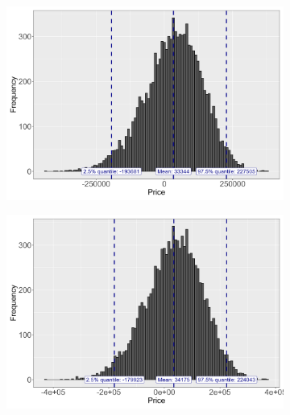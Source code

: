 \begin{figure}[!htbp]
    \centering
    \captionsetup{type=figure}
    \begin{subfigure}{0.49\textwidth}
        \centering
        \captionsetup{justification=centering}
        \includegraphics[width=\textwidth]{Figures/Prices/procedure_1_poly_model_histogram.png}
        \label{fig:irs hist of procedure 1, poly.}
    \end{subfigure}
    \hfill
    \begin{subfigure}{0.49\textwidth}
        \centering
        \captionsetup{justification=centering}
        \includegraphics[width=\textwidth]{Figures/Prices/procedure_1_spline_model_histogram.png}
        \label{fig:irs hist of procedure 1, spline.}

\end{subfigure}
\end{figure}
